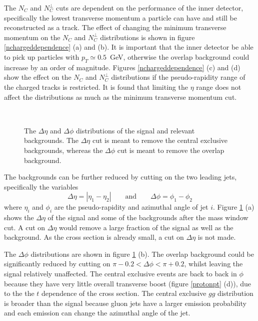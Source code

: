 The $N_C$ and $N_C^{\perp}$ cuts are dependent on the performance of the inner detector, specifically the lowest transverse momentum a particle can have and still be reconstructed as a track. The effect of changing the minimum transverse momentum on the $N_C$ and $N_C^{\perp}$ distributions is shown in figure \ref{nchargeddependence} (a) and (b). It is important that the inner detector be able to pick up particles with $p_T\simeq0.5$~GeV, otherwise the overlap background could increase by an order of magnitude. Figures \ref{nchargeddependence} (c) and (d) show the effect on the $N_C$ and $N_C^{\perp}$ distributions if the pseudo-rapidity range of the charged tracks is restricted. It is found that limiting the $\eta$ range does not affect the distributions as much as the minimum transverse momentum cut. %

\begin{figure}
\centering
\mbox{
	\quad
	}
\caption[The $\Delta\eta$ and $\Delta\phi$ distributions of the signal and relevant backgrounds]{The $\Delta\eta$ and $\Delta\phi$ distributions of the signal and relevant backgrounds. The $\Delta\eta$ cut is meant to remove the central exclusive backgrounds, whereas the $\Delta\phi$ cut is meant to remove the overlap background.
\label{jetdirections}}
\end{figure}

The backgrounds can be further reduced by cutting on the two leading jets, specifically the variables
\begin{equation}
\Delta\eta = | \eta_1 - \eta_2 |
\qquad \text{and} \qquad
\Delta\phi =  \phi_1 - \phi_2 
\end{equation}
where $\eta_i$ and $\phi_i$ are the pseudo-rapidity and azimuthal angle of jet $i$. Figure \ref{jetdirections} (a) shows the $\Delta\eta$ of the signal and some of the backgrounds after the mass window cut. 
A cut on $\Delta\eta$ would remove a large fraction of the signal as well as the background. As the cross section is already small, a cut on $\Delta\eta$ is not made.

The $\Delta\phi$ distributions are shown in figure \ref{jetdirections} (b). The overlap background could be significantly reduced by cutting on $\pi-0.2<\Delta\phi<\pi+0.2$, whilst leaving the signal relatively unaffected.  
 The central exclusive events are back to back in $\phi$ because they have very little overall transverse boost (figure \ref{protonpt} (d)), due to the the $t$ dependence of the cross section. The central exclusive $gg$ distribution is broader than the signal because gluon jets have a larger emission probability and each emission can change the azimuthal angle of the jet. 


